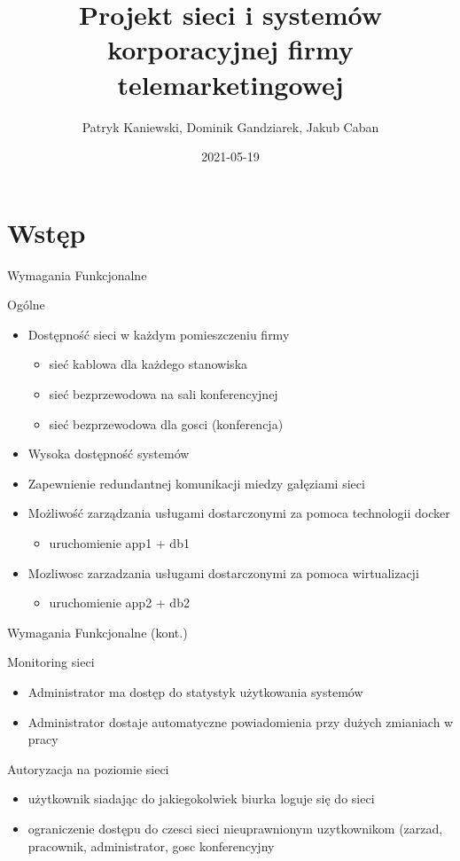 \documentclass[presentation]{beamer}
\author{Patryk Kaniewski, Dominik Gandziarek, Jakub Caban}
\date{2021-05-19}
\title{Projekt sieci i systemów korporacyjnej firmy telemarketingowej}
\begin{document}
\maketitle

\section{Wstęp}
\label{sec:orgb2a9c52}
\begin{frame}[label={sec:org7be6485}]{Wymagania Funkcjonalne}
\begin{block}{Ogólne}
\begin{itemize}
\item Dostępność sieci w każdym pomieszczeniu firmy
\begin{itemize}
\item sieć kablowa dla każdego stanowiska
\item sieć bezprzewodowa na sali konferencyjnej
\item sieć bezprzewodowa dla gosci (konferencja)
\end{itemize}
\item Wysoka dostępność systemów
\item Zapewnienie redundantnej komunikacji miedzy gałęziami sieci
\item Możliwość zarządzania usługami dostarczonymi za pomoca technologii docker
\begin{itemize}
\item uruchomienie app1 + db1
\end{itemize}
\item Mozliwosc zarzadzania usługami dostarczonymi za pomoca wirtualizacji
\begin{itemize}
\item uruchomienie app2 + db2
\end{itemize}
\end{itemize}
\end{block}
\end{frame}
\begin{frame}[label={sec:org61aabae}]{Wymagania Funkcjonalne (kont.)}
\begin{block}{Monitoring sieci}
\begin{itemize}
\item Administrator ma dostęp do statystyk użytkowania systemów
\item Administrator dostaje automatyczne powiadomienia przy dużych zmianiach w pracy
\end{itemize}
\end{block}
\begin{block}{Autoryzacja na poziomie sieci}
\begin{itemize}
\item użytkownik siadając do jakiegokolwiek biurka loguje się do sieci
\item ograniczenie dostępu do czesci sieci nieuprawnionym uzytkownikom (zarzad, pracownik, administrator, gosc konferencyjny
\end{itemize}
\end{block}
\end{frame}
\end{document}
